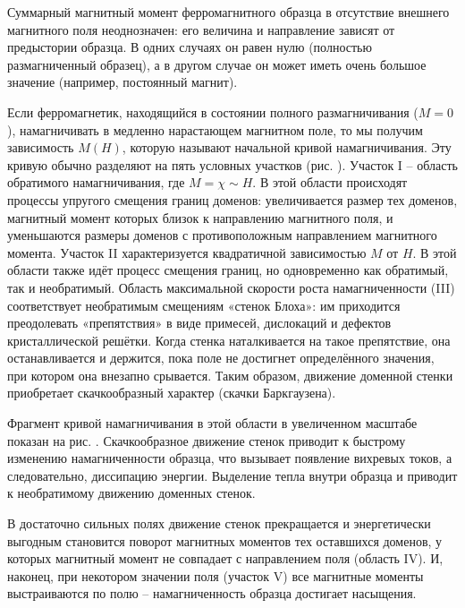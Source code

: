 
Суммарный магнитный момент ферромагнитного образца в отсутствие внешнего магнитного поля неоднозначен: его величина и направление зависят от предыстории образца. В одних случаях он равен нулю (полностью размагниченный образец), а в другом случае он может иметь очень большое значение (например, постоянный магнит).

Если ферромагнетик, находящийся в состоянии полного размагничивания ($M = 0$), намагничивать в медленно нарастающем магнитном поле, то мы получим зависимость $M(H)$, которую называют начальной кривой намагничивания. Эту кривую обычно разделяют на пять условных участков (рис. ). Участок I -- область обратимого намагничивания, где $M = \chi \sim H$. В этой области происходят процессы упругого смещения границ доменов: увеличивается размер тех доменов, магнитный момент которых близок к направлению магнитного поля, и уменьшаются размеры доменов с противоположным направлением магнитного момента. Участок II характеризуется квадратичной зависимостью $M$ от $H$. В этой области также идёт процесс смещения границ, но одновременно как обратимый, так и необратимый. Область максимальной скорости роста намагниченности (III) соответствует необратимым смещениям «стенок Блоха»: им приходится преодолевать «препятствия» в виде примесей, дислокаций и дефектов кристаллической решётки. Когда стенка наталкивается на такое препятствие, она останавливается и держится, пока поле не достигнет определённого значения, при котором она внезапно срывается. Таким образом, движение доменной стенки приобретает скачкообразный характер (скачки Баркгаузена).

Фрагмент кривой намагничивания в этой области в увеличенном масштабе показан на рис. . Скачкообразное движение стенок приводит к быстрому изменению намагниченности образца, что вызывает появление вихревых токов, а следовательно, диссипацию энергии. Выделение тепла внутри образца и приводит к необратимому движению доменных стенок.

 В достаточно сильных полях движение стенок прекращается и энергетически выгодным становится поворот магнитных моментов тех оставшихся доменов, у которых магнитный момент не совпадает с направлением поля (область IV). И, наконец, при некотором значении поля (участок V) все магнитные моменты выстраиваются по полю -- намагниченность образца достигает насыщения.

